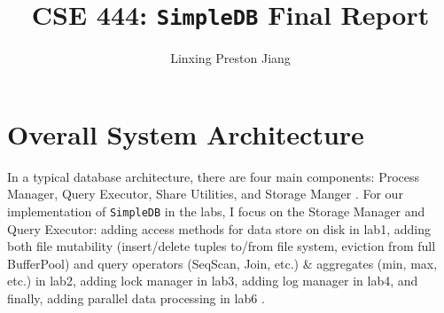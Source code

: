 \documentclass[12pt]{myland}
\def\<#1>{\texttt{#1}}
\begin{document}
\title{CSE 444: \<SimpleDB> Final Report}
\author{Linxing Preston Jiang}
\maketitle

\section{Overall System Architecture}
	\label{overview}

	\par In a typical database architecture, there are four main components: Process Manager, Query Executor, Share
Utilities, and Storage Manger \cite{lecture3}. For our implementation of \<SimpleDB> in the labs,
I focus on the Storage Manager and Query Executor: adding access methods for data store on disk in lab1, adding both file
mutability (insert/delete tuples to/from file system, eviction from full BufferPool) and query operators (SeqScan, Join,
etc.) \& aggregates (min, max, etc.) in lab2, adding lock manager in lab3, adding log manager in lab4, and finally, adding
parallel data processing in lab6 \cite{db}.
\end{document}
